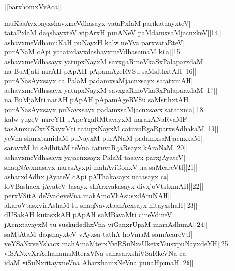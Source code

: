 \documentclass{article}
\begin{document}
\begin{center}
||barxhomxVvAca||
\end{center}

muKasAyxpayxshavxmeVdhasayx yataPxlaM parikathayxteV|\\
tataPxlaM daqshayxteV vipArxH purANeV paMdamxsaMjacnxkeV||14||\\
ashavxmeVdhamuKaH puNayxH kalw neYva parxvataRteV|\\
purANaM cApi yatatxdavxdashavxmeVdhasamaM kila||15||\\
ashavxmeVdhasayx yatupxNayxM savxgaRmoVkaSxPalaparxdaM||\\
na BuMjati narAH pApAH pApamAgeRVSu saMsithxtAH||16||\\
purANasAyxsayx ca PalaM padamxsaMjacnxsayx satatxmAH|\\
ashavxmeVdhasayx yatupxNayxM savxgaRmoVkaSxPalaparxdaM||17||\\
na BuMjaMti narAH pApAH pApamAgeRVSu saMsithxtAH|\\
purANasAyxsayx puNayxsayx padamxsaMjacnxsayx satatxma||18||\\
kalw yugeV nareYH pApeYgaRMtavayxM narakANaRvaMF|\\
tasAmxcoCxrXSayxMti tatupxNayxM catuvaRgaRparxsAdhakaM||19||\\
yeVna shurxtamidaM puNayxM purANaM padamxsaMjacnxkaM|\\
saravxM hi sAdhitaM teVna catuvaRgaRsayx kAraNaM||20||\\
ashavxmeVdhasayx yajacnxsayx PalaM tasayx parxjAyateV|\\
shaqNAvxnasayx narasAyxpi mahAviGonxV na saMcareVtf||21||\\
asharxdAdhx jAyateV cApi pAThakasayx narasayx ca|\\
loVBashacx jAyateV tasayx shArxvakasayx divxjoVtatxmAH||22||\\
perxVSitA deVvadeveVna mahAmoVhAsusxdAruNAH||\\
akaroVtasxvinAshaM tu shaqNavxtashAcxsayx nitayxshaH||23||\\
dUSakAH kutasxkAH pApAH saMBavaMti dineVdineV|\\
jAcnxtavayxM tu sushudedhxVna viGanxrUpaM mamAdhunA||24||\\
saMjAtaM daqshayxteV vAyxsa tathA hoVmaM samAcareVtf|\\
veYSaNxveYshacx mahAmaMterxYviRSuNxsUketxYsusxpuNayxdeYH||25||\\
viSANxvXrAdhanamaMterxVNa sahasarxshiVSaRkeVNa ca|\\
idaM viSuNxritayxneVna AbarxhamxNeVna punaHpunaH||26||\\
\end{document}
